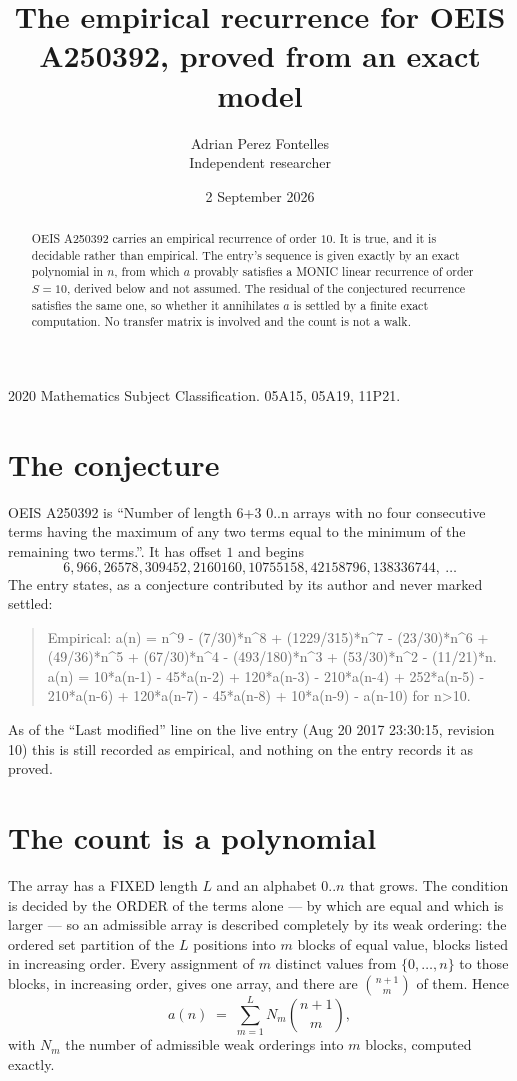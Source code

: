\documentclass[11pt,a4paper]{article}
\title{The empirical recurrence for OEIS A250392, proved from an exact model}
\author{Adrian Perez Fontelles\\ \small Independent researcher}
\date{2 September 2026}
\theoremstyle{plain}
\theoremstyle{definition}
\begin{document}
\maketitle

\begin{abstract}
OEIS A250392 carries an empirical recurrence of order $10$. It is true, and it is
decidable rather than empirical. The entry's sequence is given exactly by an exact polynomial in $n$, from
which $a$ provably satisfies a MONIC linear recurrence of order $S=10$, derived below and not
assumed. The residual of the conjectured recurrence satisfies the same one, so whether it
annihilates $a$ is settled by a finite exact computation. No transfer matrix is involved and
the count is not a walk.
\end{abstract}

\noindent\small 2020 Mathematics Subject Classification. 05A15, 05A19, 11P21.\normalsize

\section{The conjecture}

OEIS A250392 is ``Number of length 6+3 0..n arrays with no four consecutive terms having the maximum of any two terms equal to the minimum of the remaining two terms.''. It has offset $1$ and begins
\[
6, 966, 26578, 309452, 2160160, 10755158, 42158796, 138336744,\ \dots
\]
The entry states, as a conjecture contributed by its author and never marked settled:
\begin{quote}
Empirical: a(n) = n\^{}9 - (7/30)*n\^{}8 + (1229/315)*n\^{}7 - (23/30)*n\^{}6 + (49/36)*n\^{}5 + (67/30)*n\^{}4 - (493/180)*n\^{}3 + (53/30)*n\^{}2 - (11/21)*n. a(n) = 10*a(n-1) - 45*a(n-2) + 120*a(n-3) - 210*a(n-4) + 252*a(n-5) - 210*a(n-6) + 120*a(n-7) - 45*a(n-8) + 10*a(n-9) - a(n-10) for n>10.
\end{quote}
As of the ``Last modified'' line on the live entry (Aug 20 2017 23:30:15, revision 10)
this is still recorded as empirical, and nothing on the entry records it as proved.

\section{The count is a polynomial}

The array has a FIXED length $L$ and an alphabet $0..n$ that grows. The condition is decided by
the ORDER of the terms alone --- by which are equal and which is larger --- so an admissible
array is described completely by its weak ordering: the ordered set partition of the $L$
positions into $m$ blocks of equal value, blocks listed in increasing order. Every assignment
of $m$ distinct values from $\{0,\dots,n\}$ to those blocks, in increasing order, gives one
array, and there are $\binom{n+1}{m}$ of them. Hence
\[
a(n)\;=\;\sum_{m=1}^{L} N_m\binom{n+1}{m},
\]
with $N_m$ the number of admissible weak orderings into $m$ blocks, computed exactly.
\end{document}
